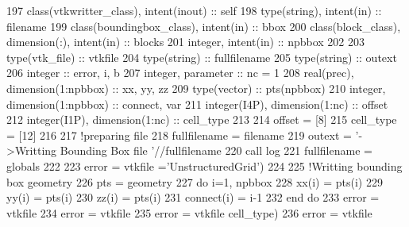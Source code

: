 \begin{DoxyCode}
197     \textcolor{keywordtype}{class}(vtkwritter\_class), \textcolor{keywordtype}{intent(inout)} :: self
198     \textcolor{keywordtype}{type}(string), \textcolor{keywordtype}{intent(in)} :: filename
199     \textcolor{keywordtype}{class}(boundingbox\_class), \textcolor{keywordtype}{intent(in)} :: bbox
200     \textcolor{keywordtype}{class}(block\_class), \textcolor{keywordtype}{dimension(:)}, \textcolor{keywordtype}{intent(in)} :: blocks
201     \textcolor{keywordtype}{integer}, \textcolor{keywordtype}{intent(in)} :: npbbox
202 
203     \textcolor{keywordtype}{type}(vtk\_file) :: vtkfile
204     \textcolor{keywordtype}{type}(string) :: fullfilename
205     \textcolor{keywordtype}{type}(string) :: outext
206     \textcolor{keywordtype}{integer} :: error, i, b
207     \textcolor{keywordtype}{integer}, \textcolor{keywordtype}{parameter} :: nc = 1
208     \textcolor{keywordtype}{real(prec)}, \textcolor{keywordtype}{dimension(1:npbbox)} :: xx, yy, zz
209     \textcolor{keywordtype}{type}(vector) :: pts(npbbox)
210     \textcolor{keywordtype}{integer}, \textcolor{keywordtype}{dimension(1:npbbox)} :: connect, var
211     \textcolor{keywordtype}{integer(I4P)}, \textcolor{keywordtype}{dimension(1:nc)} :: offset
212     \textcolor{keywordtype}{integer(I1P)}, \textcolor{keywordtype}{dimension(1:nc)} :: cell\_type
213 
214     offset = [8]
215     cell\_type = [12]
216 
217     \textcolor{comment}{!preparing file}
218     fullfilename = filename%
219     outext = \textcolor{stringliteral}{'->Writting Bounding Box file '}//fullfilename
220     \textcolor{keyword}{call }log%
221     fullfilename = globals%
222 
223     error = vtkfile%
      =\textcolor{stringliteral}{'UnstructuredGrid'})
224 
225     \textcolor{comment}{!Writting bounding box geometry}
226     pts = geometry%
227     \textcolor{keywordflow}{do} i=1, npbbox
228         xx(i) = pts(i)%
229         yy(i) = pts(i)%
230         zz(i) = pts(i)%
231         connect(i) = i-1
232 \textcolor{keywordflow}{    end do}
233     error = vtkfile%
234     error = vtkfile%
235     error = vtkfile%
      cell\_type)
236     error = vtkfile%

\end{DoxyCode}
